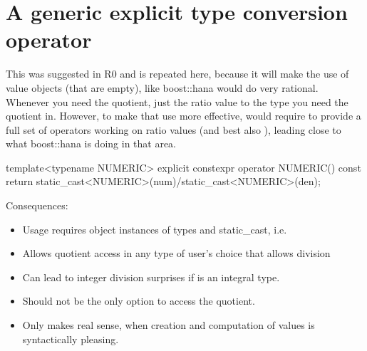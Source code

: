 \documentclass[ebook,11pt,article]{memoir}
\begin{document}
\section{A generic explicit type conversion operator}
This was suggested in R0 and is repeated here, because it will make the use of  value objects (that are empty), like boost::hana would do very rational. Whenever you need the quotient, just  the ratio value to the type you need the quotient in. However, to make that use more effective, would require to provide a full set of operators working on ratio values (and best also ), leading close to what boost::hana is doing in that area.

\begin{codeblock}
      template<typename NUMERIC>
      explicit constexpr operator NUMERIC() const{
           return static_cast<NUMERIC>(num)/static_cast<NUMERIC>(den);
      }
\end{codeblock}

Consequences:
\begin{itemize}
\item Usage requires object instances of  types and static_cast, i.e. \\
\item Allows quotient access in any type of user's choice that allows division
\item Can lead to integer division surprises if  is an integral type.
\item Should not be the only option to access the quotient.
\item Only makes real sense, when creation and computation of  values is syntactically pleasing.
\end{itemize}
\end{document}
